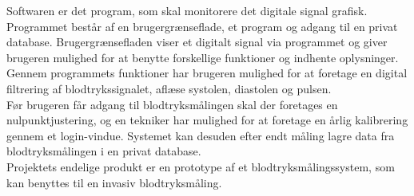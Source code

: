 Softwaren er det program, som skal monitorere det digitale signal grafisk. Programmet består af en brugergrænseflade, et program og adgang til en privat database. Brugergrænsefladen viser et digitalt signal via programmet og giver brugeren mulighed for at benytte forskellige funktioner og indhente oplysninger. Gennem programmets funktioner har brugeren mulighed for at foretage en digital filtrering af blodtrykssignalet, aflæse systolen, diastolen og pulsen.\\
 Før brugeren får adgang til blodtryksmålingen skal der foretages en nulpunktjustering, og en tekniker har mulighed for at foretage en årlig kalibrering gennem et login-vindue. Systemet kan desuden efter endt måling lagre data fra blodtryksmålingen i en privat database.\\[1ex]

Projektets endelige produkt er en prototype af et blodtryksmålingssystem, som kan benyttes til en invasiv blodtryksmåling.


